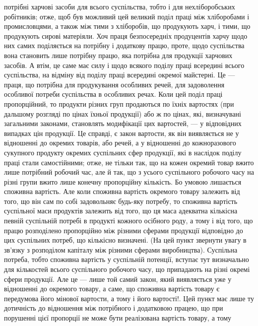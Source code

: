 \parcont{}  %
потрібні харчові засоби для всього суспільства, тобто і для нехліборобських робітників;
отже, щоб був можливий цей великий поділ праці між хліборобами
і промисловцями, а також між тими з хліборобів, що продукують харч, і тими,
що продукують сирові матеріяли. Хоч праця безпосередніх продуцентів харчу
щодо них самих поділяється на потрібну і додаткову працю, проте, щодо
суспільства вона становить лише потрібну працю, яка потрібна для продукції
харчових засобів. А втім, це саме має силу і щодо всякого поділу праці
всередині всього суспільства, на відміну від поділу праці всередині окремої майстерні.
Це — праця, що потрібна для продукування особливих речей, для задоволення
особливої потреби суспільства в особливих речах. Коли цей поділ праці
пропорційний, то продукти різних груп продаються по їхніх вартостях (при
дальшому розгляді по цінах їхньої продукції) або ж по цінах, які, визначувані
загальними законами, становлять модифікації цих вартостей, — у відповідних
випадках цін продукції. Це справді, є закон вартости, як він виявляється не
у відношенні до окремих товарів, або речей, а у відношенні до кожноразового
сукупного продукту окремих суспільних сфер продукції, які в наслідок поділу
праці стали самостійними; отже, не тільки так, що на кожен окремий товар вжито
лише потрібний робочий час, але й так, що з усього суспільного робочого часу
на різні групи вжито лише конечну пропорційну кількість. Бо умовою лишається
споживна вартість. Але коли споживна вартість окремого товару залежить
від того, що він сам по собі задовольняє будь-яку потребу, то споживна вартість
суспільної маси продуктів залежить від того, що ця маса адекватна кількісна
певній суспільній потребі в продукті кожного осібного роду, а тому і від того,
що працю розподілено пропорційно між різними сферами продукції відповідно
до цих суспільних потреб, що кількісно визначені. (На цей пункт звернути
увагу в зв’язку з розподілом капіталу між різними сферами виробництва). Суспільна
потреба, тобто споживна вартість у суспільній потенції, вступає тут визначально
для кількостей всього суспільного робочого часу, що припадають на
різні окремі сфери продукції. Але це — лише той самий закон, який виявляється
уже у відношенні до окремого товару, а саме, що споживна вартість товару
є передумова його мінової вартости, а тому і його вартості!. Цей пункт має
лише ту дотичність до відношення між потрібного і додатковою працею, що при
порушенні цієї пропорції не може бути реалізована вартість товару, а тому
